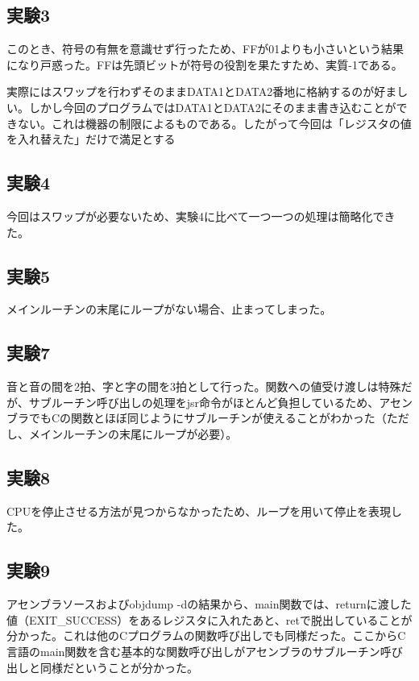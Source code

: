 \documentclass{jarticle}[2012/05/15]
\begin{document}
\subsection{実験3}
このとき、符号の有無を意識せず行ったため、FFが01よりも小さいという結果になり戸惑った。FFは先頭ビットが符号の役割を果たすため、実質-1である。\par
実際にはスワップを行わずそのままDATA1とDATA2番地に格納するのが好ましい。しかし今回のプログラムではDATA1とDATA2にそのまま書き込むことができない。これは機器の制限によるものである。したがって今回は「レジスタの値を入れ替えた」だけで満足とする
\subsection{実験4}
今回はスワップが必要ないため、実験4に比べて一つ一つの処理は簡略化できた。
\subsection{実験5}
メインルーチンの末尾にループがない場合、止まってしまった。
\subsection{実験7}
音と音の間を2拍、字と字の間を3拍として行った。関数への値受け渡しは特殊だが、サブルーチン呼び出しの処理をjsr命令がほとんど負担しているため、アセンブラでもCの関数とほぼ同じようにサブルーチンが使えることがわかった（ただし、メインルーチンの末尾にループが必要）。
\subsection{実験8}
CPUを停止させる方法が見つからなかったため、ループを用いて停止を表現した。
\subsection{実験9}
アセンブラソースおよびobjdump -dの結果から、main関数では、returnに渡した値（EXIT\_SUCCESS）をあるレジスタに入れたあと、retで脱出していることが分かった。これは他のCプログラムの関数呼び出しでも同様だった。ここからC言語のmain関数を含む基本的な関数呼び出しがアセンブラのサブルーチン呼び出しと同様だということが分かった。
\end{document}
